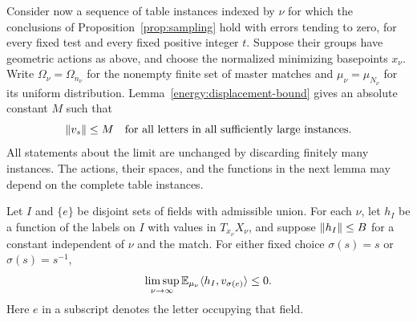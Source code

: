 Consider now a sequence of table instances indexed by $\nu$ for which
the conclusions of Proposition~\ref{prop:sampling} hold with errors
tending to zero, for every fixed test and every fixed positive integer
$t$.  Suppose their groups have geometric actions as above, and choose
the normalized minimizing basepoints $x_\nu$.  Write
$\Omega_\nu=\Omega_{n_\nu}$ for the nonempty finite set of master
matches and $\mu_\nu=\mu_{N_\nu}$ for its uniform distribution.
Lemma~\ref{energy:displacement-bound} gives an
absolute constant $M$ such that
\begin{equation}\label{energy:uniform-bound}
 \lVert v_s\rVert\le M
 \quad\text{for all letters in all sufficiently large instances.}
\end{equation}
All statements about the limit are unchanged by discarding finitely
many instances.  The actions, their spaces, and the functions in the
next lemma may depend on the complete table instances.

\newpage
\begin{lemma}\label{lem:conditional-test}
Let $I$ and $\{e\}$ be disjoint sets of fields with admissible union.
For each $\nu$, let $h_I$ be a function of the labels on $I$ with values
in $T_{x_\nu}X_\nu$, and suppose $\lVert h_I\rVert\le B$ for a constant
independent of $\nu$ and the match.  For either fixed choice
$\sigma(s)=s$ or $\sigma(s)=s^{-1}$,
\begin{equation}\label{energy:conditional-test}
 \limsup_{\nu\to\infty}
 \mathbb E_{\mu_\nu}
 \langle h_I,v_{\sigma(e)}\rangle\le0.
\end{equation}
Here $e$ in a subscript denotes the letter occupying that field.
\end{lemma}

